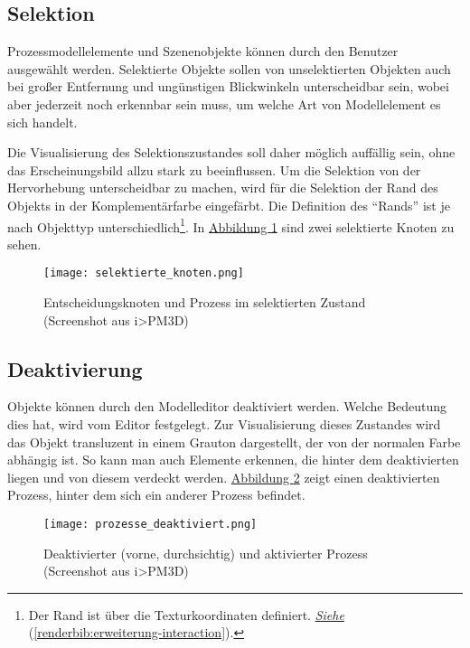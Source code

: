 \documentclass[a4paper,10pt]{sphinxmanual}
\begin{document}
\subsection{Selektion}
\label{visualisierung:selektion}
Prozessmodellelemente und Szenenobjekte können durch den Benutzer ausgewählt werden.
Selektierte Objekte sollen von unselektierten Objekten auch bei großer Entfernung und ungünstigen Blickwinkeln unterscheidbar sein, wobei aber jederzeit noch erkennbar sein muss, um welche Art von Modellelement es sich handelt.

Die Visualisierung des Selektionszustandes soll daher möglich auffällig sein, ohne das Erscheinungsbild allzu stark zu beeinflussen.
Um die Selektion von der Hervorhebung unterscheidbar zu machen, wird für die Selektion der Rand des Objekts in der Komplementärfarbe eingefärbt. Die Definition des "`Rands"' ist je nach Objekttyp unterschiedlich\footnote{
Der Rand ist über die Texturkoordinaten definiert. {\hyperref[renderbib:erweiterung-interaction]{\emph{Siehe}}} (\autoref*{renderbib:erweiterung-interaction}).
}.
In \hyperref[visualisierung:selektion-sc]{Abbildung  \ref*{visualisierung:selektion-sc}} sind zwei selektierte Knoten zu sehen.
\begin{figure}[htbp]
\centering
\capstart

\texttt{[image: selektierte\_knoten.png]}
\caption{Entscheidungsknoten und Prozess im selektierten Zustand (Screenshot aus i\textgreater{}PM3D)}\label{visualisierung:selektion-sc}\end{figure}


\subsection{Deaktivierung}
\label{visualisierung:deaktivierung}\label{visualisierung:id5}
Objekte können durch den Modelleditor deaktiviert werden. Welche Bedeutung dies hat, wird vom Editor festgelegt.
Zur Visualisierung dieses Zustandes wird das Objekt transluzent in einem Grauton dargestellt, der von der normalen Farbe abhängig ist.
So kann man auch Elemente erkennen, die hinter dem deaktivierten liegen und von diesem verdeckt werden.
\hyperref[visualisierung:deaktivierung-sc]{Abbildung  \ref*{visualisierung:deaktivierung-sc}} zeigt einen deaktivierten Prozess, hinter dem sich ein anderer Prozess befindet.
\begin{figure}[htbp]
\centering
\capstart

\texttt{[image: prozesse\_deaktiviert.png]}
\caption{Deaktivierter (vorne, durchsichtig) und aktivierter Prozess (Screenshot aus i\textgreater{}PM3D)}\label{visualisierung:deaktivierung-sc}\end{figure}
\end{document}
